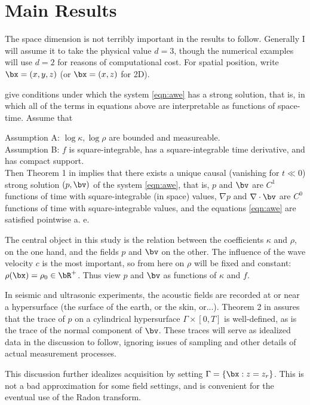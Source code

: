 \section{Main Results}

The space dimension is not terribly important in the results to
follow. Generally I will assume it to take the physical value $d=3$,
though the numerical examples will use $d=2$ for reasons of
computational cost. For spatial position, write $\bx = (x,y,z)$ (or $\bx = (x,z)$ for
2D).

\cite{BlazekStolkSymes:13} give conditions under which the system
\ref{eqn:awe} has a strong solution, that is, in which all of the
terms in equations above are interpretable as functions of space-time. Assume that

\indent Assumption A: $\log \kappa, \log \rho$ are bounded and
measureable. \\

\indent Assumption B: $f$ is square-integrable, has a square-integrable time
  derivative, and \\has compact support.\\

Then Theorem 1 in \cite{BlazekStolkSymes:13} implies that there exists
a unique causal (vanishing for $t \ll 0$) strong solution
$(p,\bv)$ of the system \ref{eqn:awe}, that is, $p$ and $\bv$ are
$C^1$ functions of time with square-integrable (in space) values,
$\nabla p$ and $\nabla \cdot \bv$ are $C^0$ functions of time with
square-integrable values,  and the equations \ref{eqn:awe} are
satisfied pointwise a. e.

The central object in this study is the relation between the
coefficients $\kappa$ and $\rho$, on the one hand, and the fields $p$
and $\bv$ on the other. The influence of the wave velocity $c$ is the
most important, so from here on $\rho$ will be fixed and constant:
$\rho(\bx) = \rho_0 \in \bR^+$. Thus view $p$ and $\bv$ as functions of
$\kappa$ and $f$.

In seismic and ultrasonic experiments, the acoustic
fields are recorded at or near a hypersurface (the surface of the
earth, or the skin, or...). Theorem 2 in \cite[]{BlazekStolkSymes:13}
assures that the trace of $p$ on a cylindrical hypersurface $\Gamma
\times [0,T]$ is well-defined, as is the trace of the normal component
of $\bv$. These traces will serve as idealized data in the discussion
to follow, ignoring issues of sampling and other details of actual
measurement processes. 

This discussion further idealizes acquisition by setting $\Gamma =
\{\bx: z=z_r\}$. This is not a bad approximation for some field
settings, and is convenient for the eventual use of the Radon
transform.

